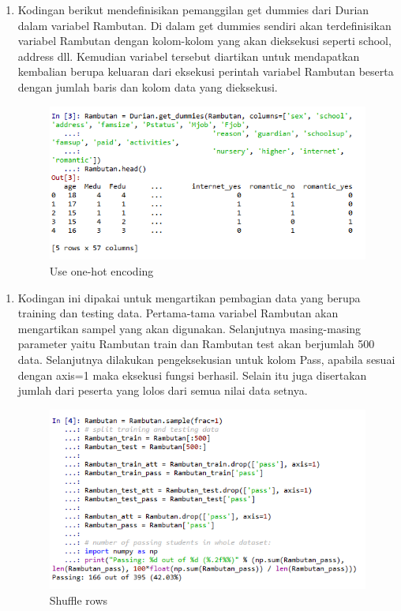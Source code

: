 \begin{enumerate}
\item Kodingan berikut mendefinisikan pemanggilan get dummies dari Durian dalam variabel Rambutan. Di dalam get dummies sendiri akan terdefinisikan variabel Rambutan dengan kolom-kolom yang akan dieksekusi seperti school, address dll. Kemudian variabel tersebut diartikan untuk mendapatkan kembalian berupa keluaran dari eksekusi perintah variabel Rambutan beserta dengan jumlah baris dan kolom data yang dieksekusi.
\begin{figure}[ht]
\centering
\includegraphics[scale=0.5]{figures/no3.png}
\caption{Use one-hot encoding}
\label{Hasil}
\end{figure}
\end{enumerate}

\begin{enumerate}
\item Kodingan ini dipakai untuk mengartikan pembagian data yang berupa training dan testing data. Pertama-tama variabel Rambutan akan mengartikan sampel yang akan digunakan. Selanjutnya masing-masing parameter yaitu Rambutan train dan Rambutan test akan berjumlah 500 data. Selanjutnya dilakukan pengeksekusian untuk kolom Pass, apabila sesuai dengan axis=1 maka eksekusi fungsi berhasil. Selain itu juga disertakan jumlah dari peserta yang lolos dari semua nilai data setnya.  
\begin{figure}[ht]
\centering
\includegraphics[scale=0.5]{figures/no4.png}
\caption{Shuffle rows}
\label{Hasil}
\end{figure}
\end{enumerate}

